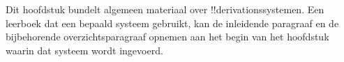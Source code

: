 \documentclass[../../../include/open-logic-chapter]{subfiles}
\begin{document}
      {}
      {}

\begin{editorial}
Dit hoofdstuk bundelt algemeen materiaal over !!{derivation}ssystemen.
Een leerboek dat een bepaald systeem gebruikt, kan de inleidende paragraaf
en de bijbehorende overzichtsparagraaf opnemen aan het begin van het
hoofdstuk waarin dat systeem wordt ingevoerd.
\end{editorial}






\OLEndChapterHook
\end{document}
